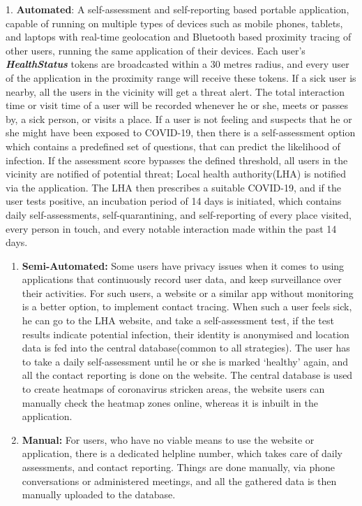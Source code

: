 \documentclass[
]{article}
\begin{document}
1. \textbf{Automated}: A self-assessment and self-reporting based
portable application, capable of running on multiple types of devices
such as mobile phones, tablets, and laptops with real-time geolocation
and Bluetooth based proximity tracing of other users, running the same
application of their devices. Each user's \textbf{\emph{HealthStatus}}
tokens are broadcasted within a 30 metres radius, and every user of the
application in the proximity range will receive these tokens. If a sick
user is nearby, all the users in the vicinity will get a threat alert.
The total interaction time or visit time of a user will be recorded
whenever he or she, meets or passes by, a sick person, or visits a
place. If a user is not feeling and suspects that he or she might have
been exposed to COVID-19, then there is a self-assessment option which
contains a predefined set of questions, that can predict the likelihood
of infection. If the assessment score bypasses the defined threshold,
all users in the vicinity are notified of potential threat; Local health
authority(LHA) is notified via the application. The LHA then prescribes
a suitable COVID-19, and if the user tests positive, an incubation
period of 14 days is initiated, which contains daily self-assessments,
self-quarantining, and self-reporting of every place visited, every
person in touch, and every notable interaction made within the past 14
days.

\begin{enumerate}
\def\labelenumi{\arabic{enumi}.}
\setcounter{enumi}{1}
\item
  \textbf{Semi-Automated:} Some users have privacy issues when it comes
  to using applications that continuously record user data, and keep
  surveillance over their activities. For such users, a website or a
  similar app without monitoring is a better option, to implement
  contact tracing. When such a user feels sick, he can go to the LHA
  website, and take a self-assessment test, if the test results indicate
  potential infection, their identity is anonymised and location data is
  fed into the central database(common to all strategies). The user has
  to take a daily self-assessment until he or she is marked `healthy'
  again, and all the contact reporting is done on the website. The
  central database is used to create heatmaps of coronavirus stricken
  areas, the website users can manually check the heatmap zones online,
  whereas it is inbuilt in the application.
\item
  \textbf{Manual:} For users, who have no viable means to use the
  website or application, there is a dedicated helpline number, which
  takes care of daily assessments, and contact reporting. Things are
  done manually, via phone conversations or administered meetings, and
  all the gathered data is then manually uploaded to the database.
\end{enumerate}
\end{document}
